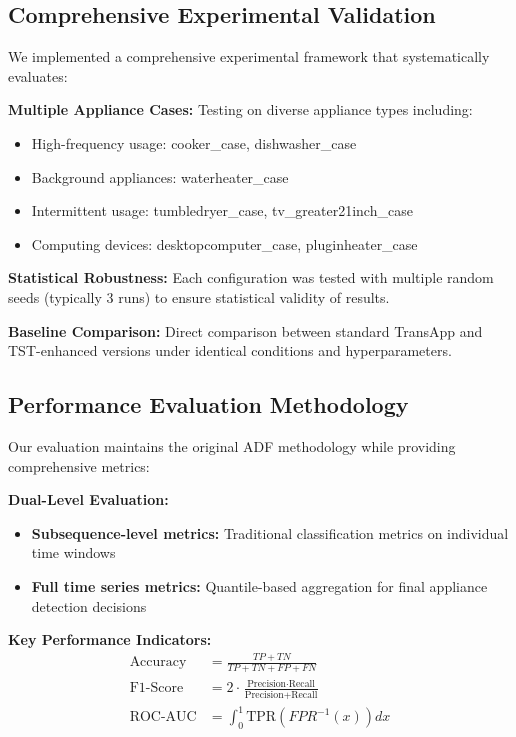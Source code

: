 \documentclass[conference]{IEEEtran}
\begin{document}
\subsection{Comprehensive Experimental Validation}

We implemented a comprehensive experimental framework that systematically evaluates:

\textbf{Multiple Appliance Cases:} Testing on diverse appliance types including:
\begin{itemize}
    \item High-frequency usage: cooker\_case, dishwasher\_case
    \item Background appliances: waterheater\_case
    \item Intermittent usage: tumbledryer\_case, tv\_greater21inch\_case
    \item Computing devices: desktopcomputer\_case, pluginheater\_case
\end{itemize}

\textbf{Statistical Robustness:} Each configuration was tested with multiple random seeds (typically 3 runs) to ensure statistical validity of results.

\textbf{Baseline Comparison:} Direct comparison between standard TransApp and TST-enhanced versions under identical conditions and hyperparameters.

\subsection{Performance Evaluation Methodology}

Our evaluation maintains the original ADF methodology while providing comprehensive metrics:

\textbf{Dual-Level Evaluation:}
\begin{itemize}
    \item \textbf{Subsequence-level metrics:} Traditional classification metrics on individual time windows
    \item \textbf{Full time series metrics:} Quantile-based aggregation for final appliance detection decisions
\end{itemize}

\textbf{Key Performance Indicators:}
\begin{align}
\text{Accuracy} &= \frac{TP + TN}{TP + TN + FP + FN} \\
\text{F1-Score} &= 2 \cdot \frac{\text{Precision} \cdot \text{Recall}}{\text{Precision} + \text{Recall}} \\
\text{ROC-AUC} &= \int_0^1 \text{TPR}(FPR^{-1}(x)) dx
\end{align}
\end{document}
